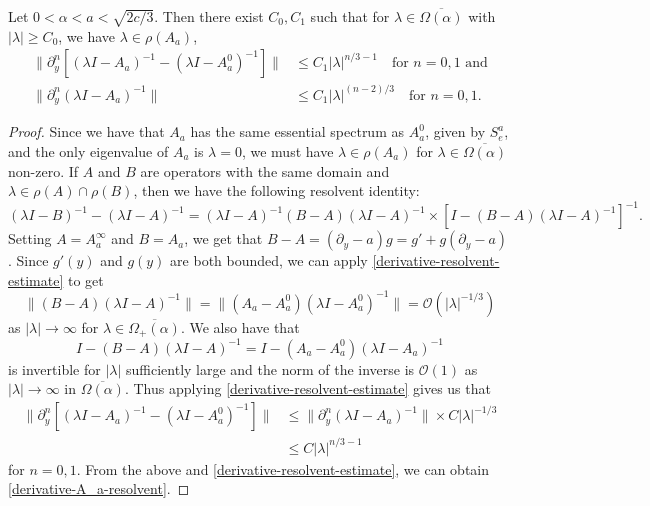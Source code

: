\begin{prop}[c.f.\ Lemma 4.4]\label{difference-of-resolvents-estimate}
	Let \(0<\alpha<a< \sqrt{2c/3}\). Then there exist \(C_0,C_1\) such that for \(\lambda\in\overline{\Omega(\alpha)}\) with \(|\lambda| \geq C_0\), we have \(\lambda\in\rho(A_a)\),
	\begin{align}
		\|\partial_y^n [(\lambda I -A_a)^{-1} - (\lambda I - A_a^0)^{-1}] \| &\leq C_1 |\lambda|^{n/3 - 1} \quad \text{for } n=0,1 \text{ and} \\
		\|\partial_y^n(\lambda I - A_a)^{-1} \| &\leq C_1 |\lambda|^{(n-2)/3} \quad \text{for } n=0,1. \label{derivative-A_a-resolvent}
	\end{align}
\end{prop}
\begin{proof}
	Since we have that \(A_a\) has the same essential spectrum as \(A_a^0\), given by \(S_e^a\), and the only eigenvalue of \(A_a\) is \(\lambda = 0\), we must have \(\lambda \in \rho(A_a)\) for \(\lambda\in\overline{\Omega(\alpha)}\) non-zero. If \(A\) and \(B\) are operators with the same domain and \(\lambda \in \rho(A)\cap\rho(B)\), then we have the following resolvent identity:
	\begin{equation}
		(\lambda I - B)^{-1} - (\lambda I - A)^{-1} = (\lambda I - A)^{-1} (B-A) (\lambda I - A)^{-1} \times \left[ I - (B-A)(\lambda I -A)^{-1} \right]^{-1}.
	\end{equation}
	Setting \(A = A_a^\infty\) and \(B = A_a\), we get that \(B-A = (\partial_y -a) g = g' + g(\partial_y -a)\). Since \(g'(y)\) and \(g(y)\) are both bounded, we can apply \cref{derivative-resolvent-estimate} to get 
	\begin{equation}
		\| (B-A)(\lambda I - A)^{-1} \| = \| (A_a - A_a^0)(\lambda I - A_a^0)^{-1} \| = \mathcal O(|\lambda|^{-1/3})
	\end{equation}
	as \(|\lambda|\to \infty\) for \(\lambda \in \overline{\Omega_+(\alpha)}\). We also have that 
	\begin{equation}
		I - (B-A)(\lambda I - A)^{-1} = I - (A_a-A_a^0)(\lambda I - A_a)^{-1}
	\end{equation}
	is invertible for \(|\lambda|\) sufficiently large and the norm of the inverse is \(\mathcal O(1)\) as \(|\lambda| \to \infty\) in \(\overline{\Omega(\alpha)}\). Thus applying \cref{derivative-resolvent-estimate} gives us that 
	\begin{equation}
		\begin{aligned}
			\|\partial_y^n [(\lambda I -A_a)^{-1} - (\lambda I - A_a^0)^{-1}] \| &\leq \|\partial_y^n (\lambda I - A_a)^{-1} \| \times C |\lambda|^{-1/3} \\
			&\leq C |\lambda|^{n/3 - 1}
		\end{aligned}
	\end{equation}
	for \(n=0,1\). From the above and \cref{derivative-resolvent-estimate}, we can obtain \cref{derivative-A_a-resolvent}.
\end{proof}

